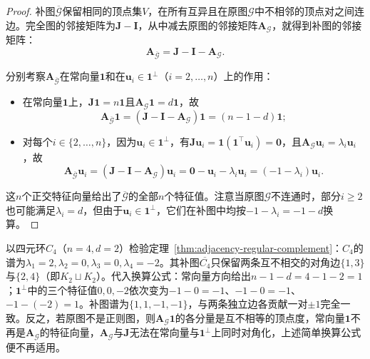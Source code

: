 \begin{proof}
补图$\overline{\mathcal G}$保留相同的顶点集$V$，在所有互异且在原图$\mathcal G$中不相邻的顶点对之间连边。完全图的邻接矩阵为$\bm J-\bm I$，从中减去原图的邻接矩阵$\bm A_{\mathcal G}$，就得到补图的邻接矩阵：
\begin{equation}
\bm A_{\overline{\mathcal G}}=\bm J-\bm I-\bm A_{\mathcal G}.
\label{eq:adjacency-complement-matrix}
\end{equation}

分别考察$\bm A_{\overline{\mathcal G}}$在常向量$\bm 1$和在$\bm u_i\in\bm 1^\perp$（$i=2,\ldots,n$）上的作用：
\begin{itemize}
\item 在常向量$\bm 1$上，$\bm J\bm 1=n\bm 1$且$\bm A_{\mathcal G}\bm 1=d\bm 1$，故
\[
\bm A_{\overline{\mathcal G}}\bm 1=(\bm J-\bm I-\bm A_{\mathcal G})\bm 1=(n-1-d)\bm 1;
\]
\item 对每个$i\in\{2,\ldots,n\}$，因为$\bm u_i\in\bm 1^\perp$，有$\bm J\bm u_i=\bm 1(\bm 1^\top\bm u_i)=\bm 0$，且$\bm A_{\mathcal G}\bm u_i=\lambda_i\bm u_i$，故
\[
\bm A_{\overline{\mathcal G}}\bm u_i=(\bm J-\bm I-\bm A_{\mathcal G})\bm u_i=\bm 0-\bm u_i-\lambda_i\bm u_i=(-1-\lambda_i)\bm u_i.
\]
\end{itemize}
这$n$个正交特征向量给出了$\overline{\mathcal G}$的全部$n$个特征值。注意当原图$\mathcal G$不连通时，部分$i\geq 2$也可能满足$\lambda_i=d$，但由于$\bm u_i\in\bm 1^\perp$，它们在补图中均按$-1-\lambda_i=-1-d$换算。
\end{proof}

以四元环$C_4$（$n=4,d=2$）检验定理~\ref{thm:adjacency-regular-complement}：$C_4$的谱为$\lambda_1=2,\lambda_2=0,\lambda_3=0,\lambda_4=-2$。其补图$\overline{C_4}$只保留两条互不相交的对角边$\{1,3\}$与$\{2,4\}$（即$K_2\sqcup K_2$）。代入换算公式：常向量方向给出$n-1-d=4-1-2=1$；$\bm 1^\perp$中的三个特征值$0,0,-2$依次变为$-1-0=-1$、$-1-0=-1$、$-1-(-2)=1$。补图谱为$\{1,1,-1,-1\}$，与两条独立边各贡献一对$\pm1$完全一致。反之，若原图不是正则图，则$\bm A_{\mathcal G}\bm 1$的各分量是互不相等的顶点度，常向量$\bm 1$不再是$\bm A_{\mathcal G}$的特征向量，$\bm A_{\mathcal G}$与$\bm J$无法在常向量与$\bm 1^\perp$上同时对角化，上述简单换算公式便不再适用。
